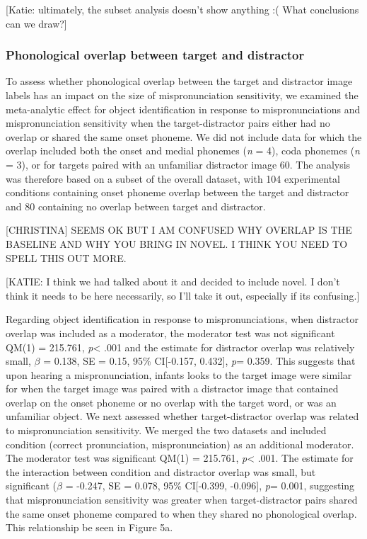 \documentclass[man]{apa6}
\theoremstyle{definition}
\theoremstyle{definition}
\theoremstyle{definition}
\theoremstyle{remark}
\begin{document}
{[}Katie: ultimately, the subset analysis doesn't show anything :( What
conclusions can we draw?{]}

\subsubsection{Phonological overlap between target and
distractor}\label{phonological-overlap-between-target-and-distractor}

To assess whether phonological overlap between the target and distractor
image labels has an impact on the size of mispronunciation sensitivity,
we examined the meta-analytic effect for object identification in
response to mispronunciations and mispronunciation sensitivity when the
target-distractor pairs either had no overlap or shared the same onset
phoneme. We did not include data for which the overlap included both the
onset and medial phonemes (\emph{n} = 4), coda phonemes (\emph{n} = 3),
or for targets paired with an unfamiliar distractor image 60. The
analysis was therefore based on a subset of the overall dataset, with
104 experimental conditions containing onset phoneme overlap between the
target and distractor and 80 containing no overlap between target and
distractor.

{[}CHRISTINA{]} SEEMS OK BUT I AM CONFUSED WHY OVERLAP IS THE BASELINE
AND WHY YOU BRING IN NOVEL. I THINK YOU NEED TO SPELL THIS OUT MORE.

{[}KATIE: I think we had talked about it and decided to include novel. I
don't think it needs to be here necessarily, so I'll take it out,
especially if its confusing.{]}

Regarding object identification in response to mispronunciations, when
distractor overlap was included as a moderator, the moderator test was
not significant QM(1) = 215.761, \emph{p}\textless{} .001 and the
estimate for distractor overlap was relatively small, \(\beta\) = 0.138,
SE = 0.15, 95\% CI{[}-0.157, 0.432{]}, \emph{p}= 0.359. This suggests
that upon hearing a mispronunciation, infants looks to the target image
were similar for when the target image was paired with a distractor
image that contained overlap on the onset phoneme or no overlap with the
target word, or was an unfamiliar object. We next assessed whether
target-distractor overlap was related to mispronunciation sensitivity.
We merged the two datasets and included condition (correct
pronunciation, mispronunciation) as an additional moderator. The
moderator test was significant QM(1) = 215.761, \emph{p}\textless{}
.001. The estimate for the interaction between condition and distractor
overlap was small, but significant (\(\beta\) = -0.247, SE = 0.078, 95\%
CI{[}-0.399, -0.096{]}, \emph{p}= 0.001, suggesting that
mispronunciation sensitivity was greater when target-distractor pairs
shared the same onset phoneme compared to when they shared no
phonological overlap. This relationship be seen in Figure 5a.
\end{document}
